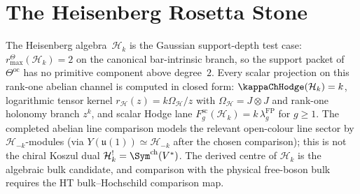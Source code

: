 %

\providecommand{\barB}{\bar{B}}
\providecommand{\cA}{\mathcal{A}}
\providecommand{\cH}{\mathcal{H}}
\providecommand{\SCchtop}{\mathsf{SC}^{\mathrm{ch,top}}}
\providecommand{\Ainf}{\mathsf{A}_{\infty}}
\providecommand{\Eone}{\mathsf{E}_1}
\providecommand{\Einf}{\mathsf{E}_{\infty}}
\providecommand{\Pinf}{\mathsf{P}_{\infty}}
\providecommand{\PVA}{\mathsf{PVA}}
\providecommand{\Ass}{\mathsf{Ass}}
\providecommand{\FM}{\mathrm{FM}}
\providecommand{\Conf}{C}
\providecommand{\dfib}{d_{\mathrm{fib}}}
\providecommand{\Dg}[1]{D_{#1}}
\providecommand{\dzero}{d_0}
\providecommand{\barBch}{\bar{B}^{\mathrm{ch}}}
\providecommand{\Omegach}{\Omega^{\mathrm{ch}}}
\providecommand{\bC}{\mathbb{C}}
\providecommand{\bR}{\mathbb{R}}
\providecommand{\C}{\mathbb{C}}
\providecommand{\R}{\mathbb{R}}
\providecommand{\Z}{\mathbb{Z}}
\providecommand{\fg}{\mathfrak{g}}
\providecommand{\id}{\mathrm{id}}
\providecommand{\Res}{\operatorname{Res}}
\providecommand{\Ran}{\operatorname{Ran}}
\providecommand{\chirCom}{\mathsf{Com}^{\mathrm{ch}}}
\providecommand{\chirLie}{\mathsf{Lie}^{\mathrm{ch}}}
\providecommand{\Linf}{\mathsf{L}_{\infty}}
\providecommand{\Hom}{\operatorname{Hom}}
\providecommand{\colldiv}[2]{D_{#1#2}}
\providecommand{\LogForm}[2]{\eta_{#1#2}}


\section{The Heisenberg Rosetta Stone}
\label{sec:rosetta-stone}

The Heisenberg algebra~$\cH_k$ is the Gaussian support-depth test case:
$r^\Theta_{\max}(\cH_k)=2$ on the canonical bar-intrinsic branch, so the
support packet of $\Theta^{\mathrm{oc}}$ has no primitive component above
degree~$2$. Every scalar projection on this rank-one abelian channel is
computed in closed form: $\kappaChHodge(\cH_k)=k$, logarithmic tensor kernel
$r_{\cH}(z)=k\Omega_{\cH}/z$ with $\Omega_{\cH}=J\otimes J$ and rank-one
holonomy branch $z^k$, and scalar Hodge lane
$F_g^{\mathrm{sc}}(\cH_k)=k\,\lambda_g^{\mathrm{FP}}$ for $g\geq1$. The
completed abelian line comparison models the relevant open-colour line sector
by $\cH_{-k}$-modules (via $Y(\mathfrak{u}(1)) \simeq \cH_{-k}$ after the
chosen comparison); this is not the chiral Koszul dual
$\cH_k^! = \Sym^{\mathrm{ch}}(V^*)$. The derived centre of $\cH_k$ is the
algebraic bulk candidate, and comparison with the physical free-boson bulk
requires the HT bulk--Hochschild comparison map.

